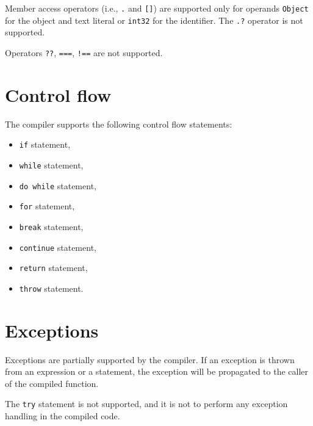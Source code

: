 Member access operators (i.e., \texttt{.} and \texttt{[]}) are supported only for operands \texttt{Object} for the object and text literal or \texttt{int32} for the identifier. The \texttt{.?} operator is not supported.

Operators \texttt{??}, \texttt{===}, \texttt{!==} are not supported.


\section{Control flow}

The compiler supports the following control flow statements:
\begin{itemize}
    \item \texttt{if} statement,
    \item \texttt{while} statement,
    \item \texttt{do while} statement,
    \item \texttt{for} statement,
    \item \texttt{break} statement,
    \item \texttt{continue} statement,
    \item \texttt{return} statement,
    \item \texttt{throw} statement.
\end{itemize}


\section{Exceptions}

Exceptions are partially supported by the compiler. If an exception is thrown from an expression or a statement, the exception will be propagated to the caller of the compiled function.

The \texttt{try} statement is not supported, and it is not to perform any exception handling in the compiled code.






